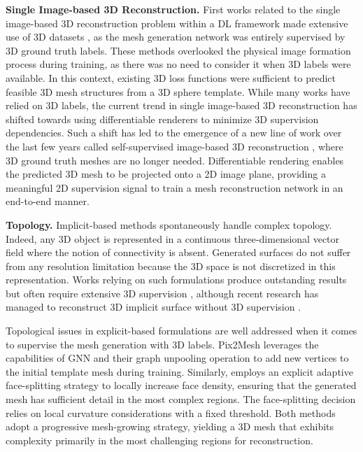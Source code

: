 \noindent\textbf{Single Image-based 3D Reconstruction.} First works related to the single image-based 3D reconstruction problem within a \ac{DL} framework \citep{choy20163d,girdhar2016learning,yang2018dense} made extensive use of 3D datasets \citep{chang2015shapenet,sun2018pix3d}, as the mesh generation network was entirely supervised by 3D ground truth labels. These methods overlooked the physical image formation process during training, as there was no need to consider it when 3D labels were available. In this context, existing 3D loss functions were sufficient to predict feasible 3D mesh structures from a 3D sphere template. While many works have relied on 3D labels, the current trend in single image-based 3D reconstruction has shifted towards using differentiable renderers to minimize 3D supervision dependencies. Such a shift has led to the emergence of a new line of work over the last few years called self-supervised image-based 3D reconstruction  \citep{kanazawa2018learning,li2020self,pavllo2020convolutional,henderson2020leveraging}, where 3D ground truth meshes are no longer needed. Differentiable rendering enables the predicted 3D mesh to be projected onto a 2D image plane, providing a meaningful 2D supervision signal to train a mesh reconstruction network in an end-to-end manner. 

\noindent\textbf{Topology.} Implicit-based methods spontaneously handle complex topology. Indeed, any 3D object is represented in a continuous three-dimensional vector field where the notion of connectivity is absent. Generated surfaces do not suffer from any resolution limitation because the 3D space is not discretized in this representation. Works relying on such formulations produce outstanding results but often require extensive 3D supervision \citep{saito2020pifuhd}, although recent research has managed to reconstruct 3D implicit surface without 3D supervision \citep{niemeyer2020differentiable,liu2019learning}. 

Topological issues in explicit-based formulations are well addressed when it comes to supervise the mesh generation with 3D labels. Pix2Mesh \citep{wang2018pixel2mesh} leverages the capabilities of \ac{GNN} and their graph unpooling operation to add new vertices to the initial template mesh during training. Similarly, \citep{smith2019geometrics} employs an explicit adaptive face-splitting strategy to locally increase face density, ensuring that the generated mesh has sufficient detail in the most complex regions. The face-splitting decision relies on local curvature considerations with a fixed threshold. Both methods adopt a progressive mesh-growing strategy, yielding a 3D mesh that exhibits complexity primarily in the most challenging regions for reconstruction. 

